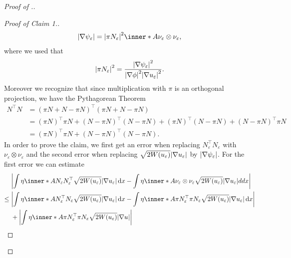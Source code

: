 \begin{proof}[Proof of .]
\begin{proof}[Proof of Claim 1.]
\begin{align*}
{{					\abs{ \nabla \psi_{ \varepsilon } } } }
			= 
			\abs{ \pi N_{ \varepsilon } }^{ 2 }
			\inner*{ A }{ \nu_{ \varepsilon } \otimes \nu_{ \varepsilon } },
		\end{align*}
		where we used that 
		\begin{equation*}
			\abs{ \pi N_{ \varepsilon } }^{ 2 }
			=
			\frac{ \abs{ \nabla \psi_{ \varepsilon } }^{ 2 } }{ \abs{ \nabla 
					\phi }^{ 2 } \abs{ \nabla u_{ \varepsilon } }^{ 2 } }.
		\end{equation*}
		Moreover we recognize that since multiplication with $ \pi $ is 
		an orthogonal projection, we have the Pythagorean Theorem
		\begin{align*}
			N^{ \top } N 
			& =
			( \pi N + N - \pi N )^{ \top } ( \pi N + N - \pi N )
			\\
			& =
			( \pi N )^{ \top } \pi N 
			+
			( N - \pi N )^{ \top } ( N - \pi N )
			+
			( \pi N )^{ \top } ( N - \pi N )
			+
			( N - \pi N )^{ \top } \pi N 
			\\
			& =
			( \pi N )^{ \top } \pi N
			+
			( N - \pi N )^{ \top } ( N - \pi N ).
		\end{align*}
		In order to prove the claim, we first get an error when replacing $ N_{ 
			\varepsilon }^{ \top } N_{ \varepsilon } $ with $ \nu_{ \varepsilon 
			} 
		\otimes \nu_{ \varepsilon } $ and the second error when replacing $ 
		\sqrt{ 2 W ( u_{ \varepsilon } ) } \abs{ \nabla u_{ \varepsilon } } $ 
		by $ \abs{ \nabla \psi_{ \varepsilon } } $.
		For the first error we can estimate
		\begin{align*}
			& \abs{ 
				\int
				\eta 
				\inner*{ A }{ N_{ \varepsilon } N_{ \varepsilon }^{ \top } }
				\sqrt{ 2 W ( u_{ \varepsilon } ) } \abs{ \nabla u_{ 
						\varepsilon } }
				\dd{ x }
				-
				\int
				\eta
				\inner*{ A }{ \nu_{ \varepsilon } \otimes \nu_{ \varepsilon 
				} }
				\sqrt{ 2 W ( u_{ \varepsilon } ) } \abs{ \nabla u_{ 
						\varepsilon } }
				dd{ x }
			}
			\\
			\leq{} &
			\abs{ 
				\int
				\eta 
				\inner*{ A }{ N_{ \varepsilon }^{ \top } N_{ \varepsilon } }
				\sqrt{ 2 W ( u_{ \varepsilon } ) } \abs{ \nabla u_{ 
						\varepsilon } } 
				\dd{ x }
				-
				\int 
				\eta
				\inner*{ A }
				{ \pi N_{ \varepsilon }^{ \top } \pi N_{ \varepsilon } }
				\sqrt{ 2 W ( u_{ \varepsilon } ) }
				\abs{ \nabla u_{ \varepsilon } }
				\dd{ x }
			}
			\\
			& + 
			\abs{ 
				\int
				\eta
				\inner*{ A }
				{ \pi N_{ \varepsilon }^{ \top } \pi N_{ \varepsilon } }
				\sqrt{ 2 W ( u_{ \varepsilon } ) } \abs{ \nabla u_{ 
}}}
\end{align*}
\end{proof}
\end{proof}
